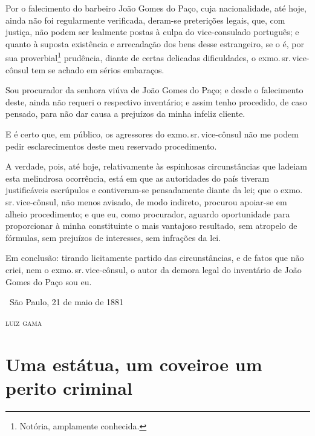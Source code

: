 Por o falecimento do barbeiro João Gomes do Paço, cuja nacionalidade,
até hoje, ainda não foi regularmente verificada, deram-se preterições
legais, que, com justiça, não podem ser lealmente postas à culpa do
vice-consulado português; e quanto à suposta existência e arrecadação
dos bens desse estrangeiro, se o é, por sua proverbial\footnote{
  Notória, amplamente conhecida.}
prudência, diante de certas
delicadas dificuldades, o exmo.\,sr.\,vice-cônsul tem se achado em sérios
embaraços.

Sou procurador da senhora viúva de João Gomes do Paço; e desde o
falecimento deste, ainda não requeri o respectivo inventário; e assim
tenho procedido, de caso pensado, para não dar causa a prejuízos da
minha infeliz cliente.

E é certo que, em público, os agressores do exmo.\,sr.\,vice-cônsul não me
podem pedir esclarecimentos deste meu reservado procedimento.

A verdade, pois, até hoje, relativamente às espinhosas circunstâncias
que ladeiam esta melindrosa ocorrência, está em que as autoridades do
país tiveram justificáveis escrúpulos e contiveram-se pensadamente
diante da lei; que o exmo.\,sr.\,vice-cônsul, não menos avisado, de modo
indireto, procurou apoiar-se em alheio procedimento; e que eu, como
procurador, aguardo oportunidade para proporcionar à minha constituinte
o mais vantajoso resultado, sem atropelo de fórmulas, sem prejuízos de
interesses, sem infrações da lei.

Em conclusão: tirando licitamente partido das circunstâncias, e de fatos
que não criei, nem o exmo.\,sr.\,vice-cônsul, o autor da demora legal do
inventário de João Gomes do Paço sou eu.

\medskip

\hfill\ São Paulo, 21 de maio de 1881

\hfill\textsc{luiz gama}

\part[Uma estátua, um coveiro e um perito criminal]{Uma estátua, um coveiro\break e um perito criminal}

